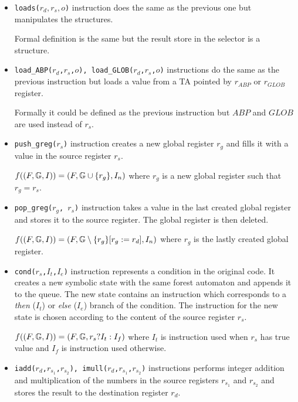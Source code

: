 \begin{itemize}
	\item {\tt loads($r_d,r_s,o$)} instruction does the same as the previous	one but manipulates the structures.
		
		Formal definition is the same but the result store in the selector is a structure.

	\item {\tt load\_ABP($r_d$,$r_s$,$o$), load\_GLOB($r_d$,$r_s$,$o$)} instructions do the same as
		the previous instruction but loads a value from a TA pointed by $r_{ABP}$ or $r_{GLOB}$ register.
		
		Formally it could be defined as the previous instruction but
		$ABP$ and $GLOB$ are used instead of $r_s$.

	\item {\tt push\_greg($r_s$)} instruction creates a new global register $r_g$
		and fills it with a value in the source register $r_s$.
		
		$f(\stdsym) = \symstate{F}
		{\regs\cup \{r_g\}}
		{I_n}$
		where $r_g$ is a new global register such that $r_g = r_s$.
	
	\item {\tt pop\_greg($r_g$, $r_s$)} instruction takes a value in the last created
		global register and stores it to the source register.
		The global register is then deleted.
		
		$f(\stdsym) = \symstate{F}
		{\regssubmin{r_g}{r_d}{r_g}}
		{I_n}$
		where $r_g$ is the lastly created global register.

	\item {\tt cond($r_s$,$I_t$,$I_e$)} instruction represents a condition in the original code.
		It creates a new symbolic state with the same forest automaton and appends
		it to the queue.
		The new state contains an instruction which corresponds to a \textit{then} ($I_t$)
		or \textit{else} ($I_e$) branch of the condition.
		The instruction for the new state is chosen according to
		the content of the source register $r_s$.

		$f(\stdsym) = \symstate{F}{\regs}{r_s ? I_t : I_f}$
		where $I_t$ is instruction used when $r_s$ has true value and
		$I_f$ is instruction used otherwise.


	\item {\tt iadd($r_d$,$r_{s_1}$,$r_{s_2}$), imull($r_d$,$r_{s_1}$,$r_{s_2}$)}
		instructions performs integer addition and multiplication of the numbers
		in the source registers $r_{s_1}$ and $r_{s_2}$ and stores the result to
		the destination register $r_d$.
		

\end{itemize}
